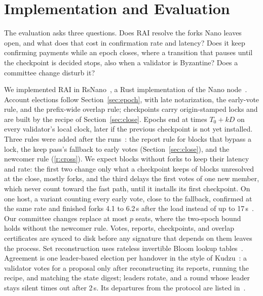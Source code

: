 \section{Implementation and Evaluation}
\label{sec:eval}

The evaluation asks three questions. Does RAI resolve the forks Nano leaves open, and what does that cost in confirmation rate and latency? Does it keep confirming payments while an epoch closes, where a transition that pauses until the checkpoint is decided stops, also when a validator is Byzantine? Does a committee change disturb it?

We implemented RAI in RsNano~\cite{rsnano}, a Rust implementation of the Nano node~\cite{nano}. Account elections follow Section~\ref{sec:epoch}, with late notarization, the early-vote rule, and the prefix-wide overlap rule; checkpoints carry origin-stamped locks and are built by the recipe of Section~\ref{sec:close}. Epochs end at times $T_0+kD$ on every validator's local clock, later if the previous checkpoint is not yet installed. Three rules were added after the runs~\cite{extended}: the report rule for blocks that bypass a lock, the keep pass's fallback to early votes (Section~\ref{sec:close}), and the newcomer rule (\ref{r:cross}). We expect blocks without forks to keep their latency and rate: the first two change only what a checkpoint keeps of blocks unresolved at the close, mostly forks, and the third delays the first votes of one new member, which never count toward the fast path, until it installs its first checkpoint. On one host, a variant counting every early vote, close to the fallback, confirmed at the same rate and finished forks 4.1 to 6.2\,s after the load instead of up to 17\,s~\cite{extended}. Our committee changes replace at most $p$ seats, where the two-epoch bound holds without the newcomer rule. Votes, reports, checkpoints, and overlap certificates are synced to disk before any signature that depends on them leaves the process. Set reconstruction uses rateless invertible Bloom lookup tables~\cite{rateless}. Agreement is one leader-based election per handover in the style of Kudzu~\cite{kudzu}: a validator votes for a proposal only after reconstructing its reports, running the recipe, and matching the state digest; leaders rotate, and a round whose leader stays silent times out after 2\,s. Its departures from the protocol are listed in~\cite{extended}.

